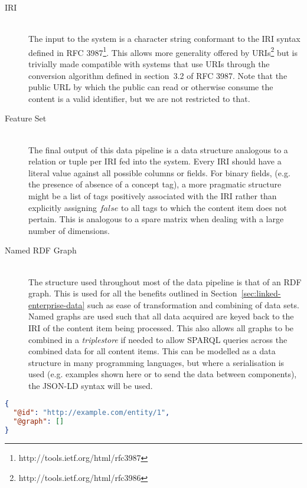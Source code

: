 \documentclass[10pt,a4paper]{report}
\begin{document}
\begin{description}

\item[IRI] \hfill \\
The input to the system is a character string conformant to the
IRI syntax defined in RFC 3987\footnote{http://tools.ietf.org/html/rfc3987}.
This allows more generality offered by
URIs\footnote{http://tools.ietf.org/html/rfc3986} but is trivially made
compatible with systems that use URIs through the conversion algorithm defined
in section~3.2 of RFC 3987. Note that the public URL by which the public can
read or otherwise consume the content is a valid identifier, but we are not
restricted to that.

\item[Feature Set] \hfill \\
The final output of this data pipeline is a data structure
analogous to a relation or tuple per IRI fed into the system. Every IRI should
have a literal value against all possible columns or fields. For binary fields,
(e.g. the presence of absence of a concept tag), a more pragmatic structure
might be a list of tags positively associated with the IRI rather than
explicitly assigning $false$ to all tags to which the content item does not
pertain. This is analogous to a spare matrix when dealing with a large number
of dimensions.

\item[Named RDF Graph] \hfill \\
The structure used throughout most of the data pipeline
is that of an RDF graph. This is used for all the benefits outlined in
Section~\ref{sec:linked-enterprise-data} such as ease of transformation and
combining of data sets. Named graphs are used such that all data acquired
are keyed back to the IRI of the content item being processed. This also allows
all graphs to be combined in a \emph{triplestore} if needed to allow SPARQL
queries across the combined data for all content items. This can be modelled as
a data structure in many programming languages, but where a serialisation is
used (e.g. examples shown here or to send the data between components), the
JSON-LD\cite{sporny2014json} syntax will be used.
\end{description}

\begin{centering}
\begin{lstlisting}[label=lst:jsonld-identity,caption={Identity graph for a content item in JSON-LD syntax},language=json]
{
  "@id": "http://example.com/entity/1",
  "@graph": []
}
\end{lstlisting}
\end{centering}
\end{document}
